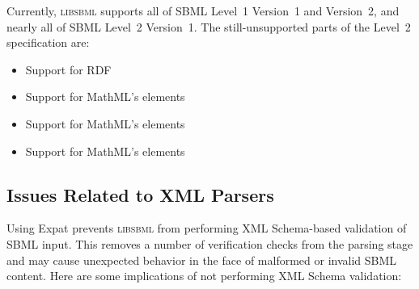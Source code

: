 \documentclass{sbmlmanual}
\newcommand{\libsbml}{\textsc{libsbml}}
\begin{document}
Currently, \libsbml{} supports all of SBML Level~1 Version~1 and Version~2,
and nearly all of SBML Level~2 Version~1.  The still-unsupported parts of
the Level~2 specification are:

\begin{itemize}\setlength{\parskip}{-0.25ex}
\item Support for RDF
\item Support for MathML's  elements
\item Support for MathML's  elements
\item Support for MathML's  elements
\end{itemize}


\subsection{Issues Related to XML Parsers}
\label{sec:issues-about-parsers}

Using Expat prevents \libsbml{} from performing XML Schema-based validation
of SBML input.  This removes a number of verification checks from the
parsing stage and may cause unexpected behavior in the face of malformed or
invalid SBML content.  Here are some implications of not performing XML
Schema validation:
\end{document}
